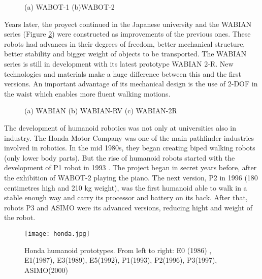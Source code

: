 \begin{figure}[!hbt]
\centering 
{}\hspace{10mm}
\caption{(a) WABOT-1 (b)WABOT-2}
\label{fig:wabot}
\end{figure}

Years later, the proyect continued in the Japanese university and the WABIAN series (Figure \ref{fig:wabian}) were constructed as improvements of the previous ones. These robots had advances in their degrees of freedom, better mechanical structure, better stability and bigger weight of objects to be transported. The WABIAN series is still in development with its latest prototype WABIAN 2-R. New technologies and materials make a huge difference between this and the first versions. An important advantage of its mechanical design is the use of 2-DOF in the waist which enables more fluent walking motions. 

\begin{figure}[!hbt]
\centering 
{}\hspace{10mm}
\hspace{10mm}
\caption{(a) WABIAN (b) WABIAN-RV (c) WABIAN-2R }
\label{fig:wabian}
\end{figure}

The development of humanoid robotics was not only at universities also in industry. The Honda Motor Company was one of the main pathfinder industries involved in robotics. In the mid 1980s, they began creating biped walking robots (only lower body parts). But the rise of humanoid robots started with the development of P1 robot in 1993 \cite{Kaj2005}. The project began in secret years before, after the exhibition of WABOT-2 playing the piano. The next version, P2 in 1996 (180 centimetres high and 210 kg weight), was the first humanoid able to walk in a stable enough way and carry its processor and battery on its back. After that, robots P3 and ASIMO were its advanced versions, reducing hight and weight of the robot.


\begin{figure}[!hbt]
\centering
\texttt{[image: honda.jpg]}
\caption{Honda humanoid prototypes. From left to right: E0 (1986) , E1(1987), E3(1989), E5(1992), P1(1993), P2(1996), P3(1997), ASIMO(2000)}
\label{fig:honda}
\end{figure}

